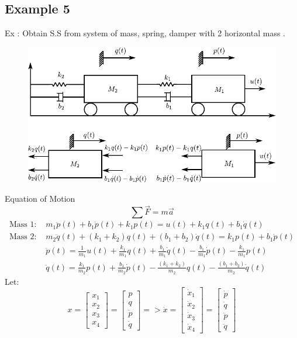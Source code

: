\documentclass[12pt,a4paper]{article}
\begin{document}
	\subsection{Example 5}
	Ex : Obtain S.S from system of mass, spring, damper with 2 horizontal mass .
	\begin{figure}[]
		\centering
		\includegraphics[scale=1]{src/img3.pdf}
	\end{figure}
	Equation of Motion
	\[
	\sum \vec{F} = m\vec{a}
	\]
	\[
	\begin{split}
		\text{Mass 1: }& m_1\ddot{p}(t) + b_1\dot{p}(t) + k_1p(t) = u(t) +k_1q(t)+b_1\dot{q}(t) \\
		\text{Mass 2: }& m_2\ddot{q}(t) + (k_1+k_2)q(t) + (b_1+b_2)\dot{q}(t) = k_1p(t)+b_1\dot{p}(t) \\
		&\ddot{p}(t)= \frac{1}{m_1}u(t) +\frac{k_1}{m_1}q(t)+\frac{b_1}{m_1}\dot{q}(t) - \frac{b_1}{m_1}\dot{p}(t) - \frac{k_1}{m_1}p(t)\\
		&\ddot{q}(t)= \frac{k_1}{m_2}p(t)+\frac{b_1}{m_2}\dot{p}(t) - \frac{(k_1+k_2)}{m_2}q(t) - \frac{(b_1+b_2)}{m_2}\dot{q}(t)
	\end{split}
	\]
	Let:
	\[
	x = 
	\begin{bmatrix}
		x_1 \\
		x_2 \\
		x_3 \\
		x_4 
	\end{bmatrix}
	= 
	\begin{bmatrix}
		p       \\
		q       \\
		\dot{p} \\
		\dot{q} 
	\end{bmatrix}
	=>
	\dot{x} = 
	\begin{bmatrix}
		\dot{x}_1 \\
		\dot{x}_2 \\
		\dot{x}_3 \\
		\dot{x}_4 
	\end{bmatrix}
	= 
	\begin{bmatrix}
		\dot{p}  \\
		\dot{q}  \\
		\ddot{p} \\
		\ddot{q} 
	\end{bmatrix}
	\]
\end{document}
